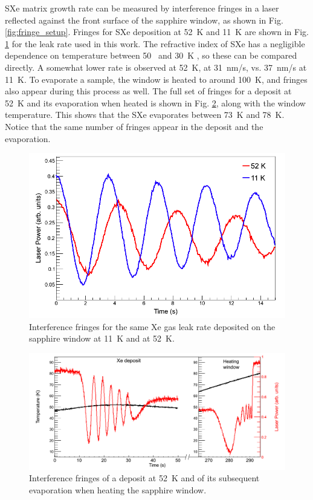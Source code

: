 SXe matrix growth rate can be measured by interference fringes in a laser reflected against the front surface of the sapphire window, as shown in Fig. \ref{fig:fringe_setup}.  Fringes for SXe deposition at 52~K and 11~K are shown in Fig. \ref{fig:fringes_52K_vs_11K} for the leak rate used in this work.  The refractive index of SXe has a negligible dependence on temperature between 50~ and 30~K \cite{SXeIndex}, so these can be compared directly.  A somewhat lower rate is observed at 52~K, at 31~nm/s, vs. 37~nm/s at 11~K.  To evaporate a sample, the window is heated to around 100~K, and fringes also appear during this process as well.  The full set of fringes for a deposit at 52~K and its evaporation when heated is shown in Fig. \ref{fig:fringes_melt_withDep}, along with the window temperature.  This shows that the SXe evaporates between 73~K and 78~K.  Notice that the same number of fringes appear in the deposit and the evaporation.

\begin{figure} %
        \centering
                \includegraphics[width=.7\textwidth]{figures/fringes_52K_vs_11K.png}
                \caption{Interference fringes for the same Xe gas leak rate deposited on the sapphire window at 11~K and at 52~K.}
\label{fig:fringes_52K_vs_11K}
\end{figure}

\begin{figure} %
        \centering
                \includegraphics[width=.9\textwidth]{figures/fringes_dep_and_melt.png}
                \caption{Interference fringes of a deposit at 52~K and of its subsequent evaporation when heating the sapphire window.}
\label{fig:fringes_melt_withDep}
\end{figure}

